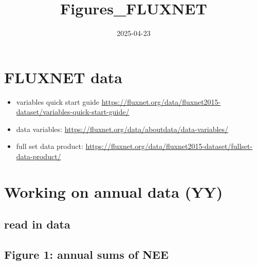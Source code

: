 \documentclass[
]{article}
\title{Figures\_FLUXNET}
\author{}
\date{\vspace{-2.5em}2025-04-23}
\newenvironment{Shaded}{\begin{snugshade}}{\end{snugshade}}
\newcommand{\DecValTok}[1]{\textcolor[rgb]{0.00,0.00,0.81}{#1}}
\newcommand{\FunctionTok}[1]{\textcolor[rgb]{0.13,0.29,0.53}{\textbf{#1}}}
\newcommand{\NormalTok}[1]{#1}
\newcommand{\OtherTok}[1]{\textcolor[rgb]{0.56,0.35,0.01}{#1}}
\newcommand{\SpecialCharTok}[1]{\textcolor[rgb]{0.81,0.36,0.00}{\textbf{#1}}}
\newcommand{\StringTok}[1]{\textcolor[rgb]{0.31,0.60,0.02}{#1}}
\providecommand{\tightlist}{%
  \setlength{\itemsep}{0pt}\setlength{\parskip}{0pt}}
\begin{document}
\maketitle

\section{FLUXNET data}\label{fluxnet-data}

\begin{itemize}
\tightlist
\item
  variables quick start guide
  \url{https://fluxnet.org/data/fluxnet2015-dataset/variables-quick-start-guide/}
\item
  data variables:
  \url{https://fluxnet.org/data/aboutdata/data-variables/}
\item
  full set data product:
  \url{https://fluxnet.org/data/fluxnet2015-dataset/fullset-data-product/}
\end{itemize}

\section{Working on annual data (YY)}\label{working-on-annual-data-yy}

\subsection{read in data}\label{read-in-data}

\begin{Shaded}
\end{Shaded}

\subsection{Figure 1: annual sums of
NEE}\label{figure-1-annual-sums-of-nee}
\end{document}
